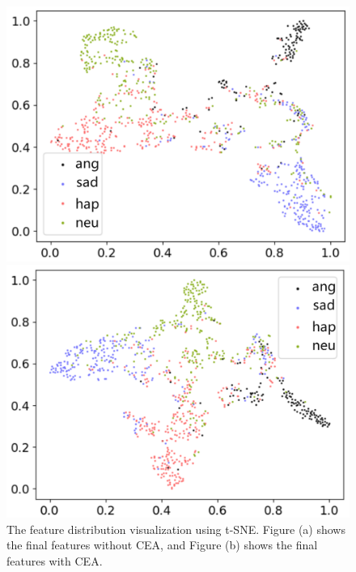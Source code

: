 \documentclass[runningheads]{llncs}
\begin{document}
\begin{figure}[htbp]
\centering
{}%
{
    \begin{minipage}[b]{0.8\linewidth}
        \centering
        \includegraphics[width=0.8\linewidth]{withoutCEA_0_2_Fagain.jpg}
    \end{minipage}
}
{
 	\begin{minipage}[b]{0.8\linewidth}
        \centering
        \includegraphics[width=0.8\linewidth]{withCEA_0_2_Fagain.jpg}
    \end{minipage}
}
\caption{The feature distribution visualization using t-SNE. Figure (a) shows the final features without CEA, and Figure (b) shows the final features with CEA.}
\label{TSNE}
\end{figure}
\end{document}
